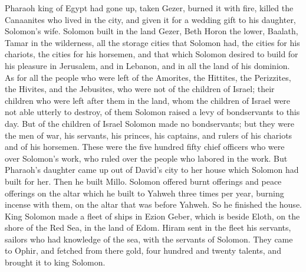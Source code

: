 {Pharaoh king of Egypt had gone up, taken Gezer, burned it with fire, killed the Canaanites who lived in the city, and given it for a wedding gift to his daughter, Solomon’s wife.
Solomon built in the land Gezer, Beth Horon the lower,
Baalath, Tamar in the wilderness,
all the storage cities that Solomon had, the cities for his chariots, the cities for his horsemen, and that which Solomon desired to build for his pleasure in Jerusalem, and in Lebanon, and in all the land of his dominion.
As for all the people who were left of the Amorites, the Hittites, the Perizzites, the Hivites, and the Jebusites, who were not of the children of Israel;
their children who were left after them in the land, whom the children of Israel were not able utterly to destroy, of them Solomon raised a levy of bondservants to this day.
But of the children of Israel Solomon made no bondservants; but they were the men of war, his servants, his princes, his captains, and rulers of his chariots and of his horsemen.
These were the five hundred fifty chief officers who were over Solomon’s work, who ruled over the people who labored in the work.
But Pharaoh’s daughter came up out of David’s city to her house which Solomon had built for her. Then he built Millo.
Solomon offered burnt offerings and peace offerings on the altar which he built to Yahweh three times per year, burning incense with them, on the altar that was before Yahweh. So he finished the house.
King Solomon made a fleet of ships in Ezion Geber, which is beside Eloth, on the shore of the Red Sea, in the land of Edom.
Hiram sent in the fleet his servants, sailors who had knowledge of the sea, with the servants of Solomon.
They came to Ophir, and fetched from there gold, four hundred and twenty talents, and brought it to king Solomon.

}
